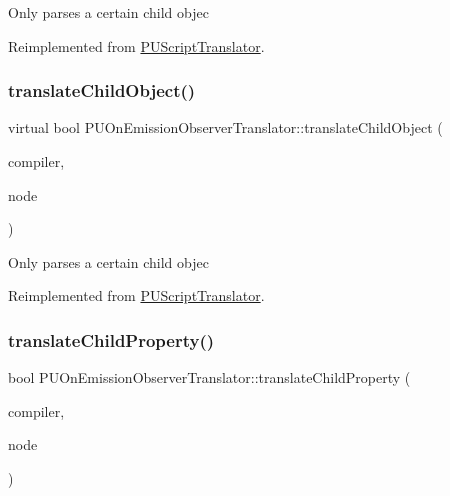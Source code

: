 Only parses a certain child objec 

Reimplemented from \hyperlink{classPUScriptTranslator_ab587d01348ae3e678cb700c719b2b113}{P\+U\+Script\+Translator}.

\mbox{\label{classPUOnEmissionObserverTranslator_ab81e1cae6233df0ba1c4227edbdf59d2}} 
\subsubsection{\texorpdfstring{translate\+Child\+Object()}{translateChildObject()}\hspace{0.1cm}{\footnotesize\ttfamily [2/2]}}
{\footnotesize\ttfamily virtual bool P\+U\+On\+Emission\+Observer\+Translator\+::translate\+Child\+Object (\begin{DoxyParamCaption}\item[{\hyperlink{classPUScriptCompiler}{P\+U\+Script\+Compiler} $\ast$}]{compiler,  }\item[{\hyperlink{classPUAbstractNode}{P\+U\+Abstract\+Node} $\ast$}]{node }\end{DoxyParamCaption})\hspace{0.3cm}{\ttfamily [virtual]}}

Only parses a certain child objec 

Reimplemented from \hyperlink{classPUScriptTranslator_ab587d01348ae3e678cb700c719b2b113}{P\+U\+Script\+Translator}.

\mbox{\label{classPUOnEmissionObserverTranslator_a9bec17fbbb8efe92be3b23e02c7ce6a9}} 
\subsubsection{\texorpdfstring{translate\+Child\+Property()}{translateChildProperty()}\hspace{0.1cm}{\footnotesize\ttfamily [1/2]}}
{\footnotesize\ttfamily bool P\+U\+On\+Emission\+Observer\+Translator\+::translate\+Child\+Property (\begin{DoxyParamCaption}\item[{\hyperlink{classPUScriptCompiler}{P\+U\+Script\+Compiler} $\ast$}]{compiler,  }\item[{\hyperlink{classPUAbstractNode}{P\+U\+Abstract\+Node} $\ast$}]{node }\end{DoxyParamCaption})\hspace{0.3cm}{\ttfamily [virtual]}}

